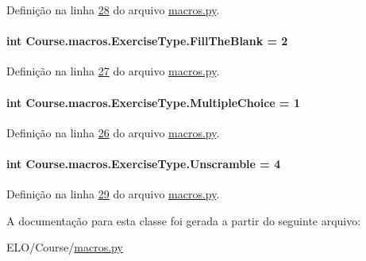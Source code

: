 Definição na linha \hyperlink{macros_8py_source_l00028}{28} do arquivo \hyperlink{macros_8py_source}{macros.\+py}.

\hypertarget{classCourse_1_1macros_1_1ExerciseType_a5e880e89e6942b6cc6da78e9443aaabf}{}
\paragraph[{Fill\+The\+Blank}]{\setlength{\rightskip}{0pt plus 5cm}int Course.\+macros.\+Exercise\+Type.\+Fill\+The\+Blank = 2\hspace{0.3cm}{\ttfamily [static]}}\label{classCourse_1_1macros_1_1ExerciseType_a5e880e89e6942b6cc6da78e9443aaabf}


Definição na linha \hyperlink{macros_8py_source_l00027}{27} do arquivo \hyperlink{macros_8py_source}{macros.\+py}.

\hypertarget{classCourse_1_1macros_1_1ExerciseType_a0ad70d05309ba8aacd0a808e20089a9f}{}
\paragraph[{Multiple\+Choice}]{\setlength{\rightskip}{0pt plus 5cm}int Course.\+macros.\+Exercise\+Type.\+Multiple\+Choice = 1\hspace{0.3cm}{\ttfamily [static]}}\label{classCourse_1_1macros_1_1ExerciseType_a0ad70d05309ba8aacd0a808e20089a9f}


Definição na linha \hyperlink{macros_8py_source_l00026}{26} do arquivo \hyperlink{macros_8py_source}{macros.\+py}.

\hypertarget{classCourse_1_1macros_1_1ExerciseType_a5d5313adddb807b0cac94f5da44af978}{}
\paragraph[{Unscramble}]{\setlength{\rightskip}{0pt plus 5cm}int Course.\+macros.\+Exercise\+Type.\+Unscramble = 4\hspace{0.3cm}{\ttfamily [static]}}\label{classCourse_1_1macros_1_1ExerciseType_a5d5313adddb807b0cac94f5da44af978}


Definição na linha \hyperlink{macros_8py_source_l00029}{29} do arquivo \hyperlink{macros_8py_source}{macros.\+py}.



A documentação para esta classe foi gerada a partir do seguinte arquivo\+:\begin{DoxyCompactItemize}
\item 
E\+L\+O/\+Course/\hyperlink{macros_8py}{macros.\+py}\end{DoxyCompactItemize}
